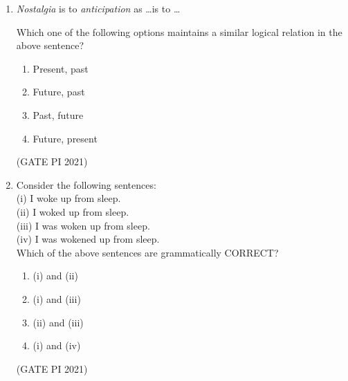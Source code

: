 \documentclass[journal,12pt,onecolumn]{IEEEtran}
\theoremstyle{remark}
\begin{document}
\begin{enumerate}
\begin{multicols}{4}
\begin{enumerate}
\item 4
\item 3
\item 6
\item 7
\end{enumerate}
\end{multicols}
\hfill (GATE PI 2021)

\item \textit{Nostalgia} is to \textit{anticipation} as \dots is to \dots

Which one of the following options maintains a similar logical relation in the above sentence?
\begin{multicols}{4}
\begin{enumerate}
\item Present, past
\item Future, past
\item Past, future
\item Future, present
\end{enumerate}
\end{multicols}
\hfill (GATE PI 2021)

\item Consider the following sentences:\\
(i)  I woke up from sleep.\\
(ii)  I woked up from sleep.\\
(iii) I was woken up from sleep.\\
(iv) I was wokened up from sleep.\\
Which of the above sentences are grammatically CORRECT?
\begin{multicols}{4}
\begin{enumerate}
\item (i) and (ii)
\item (i) and (iii)
\item (ii) and (iii)
\item (i) and (iv)
\end{enumerate}
\end{multicols}

\hfill (GATE PI 2021)



\end{enumerate}
\end{document}
